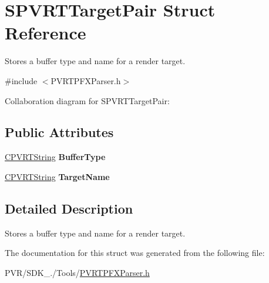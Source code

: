 \hypertarget{struct_s_p_v_r_t_target_pair}{\section{S\+P\+V\+R\+T\+Target\+Pair Struct Reference}
\label{struct_s_p_v_r_t_target_pair}
}


Stores a buffer type and name for a render target.  




{\ttfamily \#include $<$P\+V\+R\+T\+P\+F\+X\+Parser.\+h$>$}



Collaboration diagram for S\+P\+V\+R\+T\+Target\+Pair\+:
\subsection*{Public Attributes}
\begin{DoxyCompactItemize}
\item 
\hypertarget{struct_s_p_v_r_t_target_pair_adff70a3ae33ac3e867b8d20a6b6cf000}{\hyperlink{class_c_p_v_r_t_string}{C\+P\+V\+R\+T\+String} {\bfseries Buffer\+Type}}\label{struct_s_p_v_r_t_target_pair_adff70a3ae33ac3e867b8d20a6b6cf000}

\item 
\hypertarget{struct_s_p_v_r_t_target_pair_ab6a8e376aa5563d5f153d13465f81549}{\hyperlink{class_c_p_v_r_t_string}{C\+P\+V\+R\+T\+String} {\bfseries Target\+Name}}\label{struct_s_p_v_r_t_target_pair_ab6a8e376aa5563d5f153d13465f81549}

\end{DoxyCompactItemize}


\subsection{Detailed Description}
Stores a buffer type and name for a render target. 



 

The documentation for this struct was generated from the following file\+:\begin{DoxyCompactItemize}
\item 
P\+V\+R/\+S\+D\+K\+\_./\+Tools/\hyperlink{_p_v_r_t_p_f_x_parser_8h}{P\+V\+R\+T\+P\+F\+X\+Parser.\+h}\end{DoxyCompactItemize}
